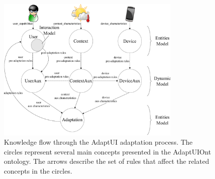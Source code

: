 \begin{figure}[H]
\centering
\includegraphics[width=0.80\textwidth]{flow_diagram.pdf}
\caption{Knowledge flow through the AdaptUI adaptation process. The circles
represent several main concepts presented in the AdaptUIOnt ontology. The arrows
describe the set of rules that affect the related concepts in the circles.}
\label{fig:flow_diagram}
\end{figure}



